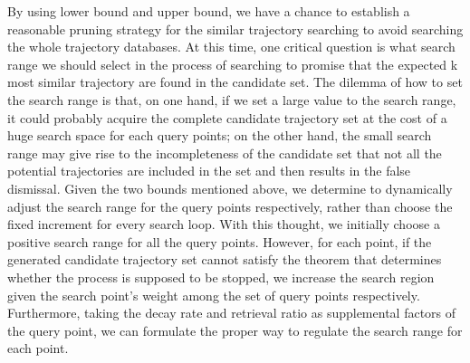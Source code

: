 \begin{bigabstract}
By using lower bound and upper bound, we have a chance to establish a reasonable pruning strategy for the similar trajectory searching to avoid searching the whole trajectory databases. At this time, one critical question is what search range we should select in the process of searching to promise that the expected k most similar trajectory are found in the candidate set. The dilemma of how to set the search range is that, on one hand, if we set a large value to the search range, it could probably acquire the complete candidate trajectory set at the cost of a huge search space for each query points; on the other hand, the small search range may give rise to the incompleteness of the candidate set that not all the potential trajectories are included in the set and then results in the false dismissal. Given the two bounds mentioned above, we determine to dynamically adjust the search range for the query points respectively, rather than choose the fixed increment for every search loop. With this thought, we initially choose a positive search range for all the query points. However, for each point, if the generated candidate trajectory set cannot satisfy the theorem that determines whether the process is supposed to be stopped, we increase the search region given the search point's weight among the set of query points respectively. Furthermore, taking the decay rate and retrieval ratio as supplemental factors of the query point, we can formulate the proper way to regulate the search range for each point.


\end{bigabstract}
